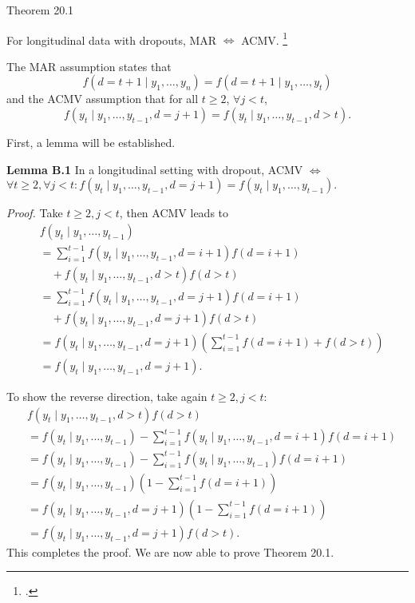 \documentclass[UTF8,a4paper,10pt]{article}
\begin{document}
\pagebreak


\begin{Problem}[]{}
    Theorem 20.1
    
    For longitudinal data with dropouts, MAR \(\Longleftrightarrow\)  ACMV.
     \footcite[][334]{Verbeke2001}
\end{Problem}


The MAR assumption states that
\begin{equation*}
    f(d = t + 1\mid y_1,\ldots,y_n) = f(d = t + 1\mid y_1,\ldots,y_t) \tag*{(B.9)}
\end{equation*}
and the ACMV assumption that for all \(t \geq 2\), \(\forall j < t\),
\begin{equation*}
    f(y_t\mid y_1,\ldots,y_{t-1}, d = j + 1) = f(y_t\mid y_1,\ldots,y_{t-1},d > t). \tag*{(B.10)}
\end{equation*}

First, a lemma will be established.

\textbf{Lemma B.1} In a longitudinal setting with dropout, ACMV \(\Leftrightarrow\) \(\forall t \geq 2, \forall j < t : f(y_t\mid y_1,\ldots,y_{t-1}, d = j + 1) = f(y_t\mid y_1,\ldots,y_{t-1}).\)

\textit{Proof.} Take \(t \geq 2, j < t\), then ACMV leads to
\begin{align*}
    &f(y_t\mid y_1,\ldots,y_{t-1}) \\
    &= \sum_{i=1}^{t-1} f(y_t\mid y_1,\ldots,y_{t-1}, d = i + 1)f(d = i + 1) \\
    &\quad + f(y_t\mid y_1,\ldots,y_{t-1},d > t)f(d>t) \\
    &= \sum_{i=1}^{t-1} f(y_t\mid y_1,\ldots,y_{t-1}, d = j + 1)f(d = i + 1) \\
    &\quad + f(y_t\mid y_1,\ldots,y_{t-1}, d = j + 1)f(d>t) \\
    &= f(y_t\mid y_1,\ldots,y_{t-1}, d = j + 1) \left( \sum_{i=1}^{t-1} f(d = i + 1) + f(d>t) \right) \\
    &= f(y_t\mid y_1,\ldots,y_{t-1}, d = j + 1).
\end{align*}

To show the reverse direction, take again \(t \geq 2, j < t\):
\begin{align*}
    &f(y_t\mid y_1,\ldots,y_{t-1},d > t)f(d>t) \\
    &= f(y_t\mid y_1,\ldots,y_{t-1}) - \sum_{i=1}^{t-1} f(y_t\mid y_1,\ldots,y_{t-1}, d = i + 1)f(d = i + 1) \\
    &= f(y_t\mid y_1,\ldots,y_{t-1}) - \sum_{i=1}^{t-1} f(y_t\mid y_1,\ldots,y_{t-1})f(d = i + 1) \\
    &= f(y_t\mid y_1,\ldots,y_{t-1}) \left( 1 - \sum_{i=1}^{t-1} f(d = i + 1) \right)\\
    &= f(y_t\mid y_1,\ldots,y_{t-1}, d = j + 1) \left(1 - \sum_{i=1}^{t-1} f(d = i + 1)\right) \\
    &= f(y_t\mid y_1,\ldots,y_{t-1}, d = j + 1)f(d>t).
\end{align*}
This completes the proof. We are now able to prove Theorem 20.1.
\end{document}
